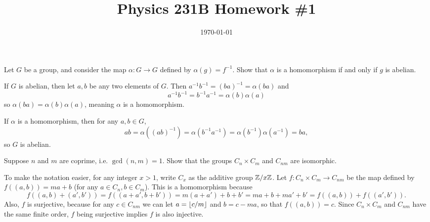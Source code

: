 \documentclass{article}
\date{\today}
\title{Physics 231B Homework \#1}
\begin{document}
\maketitle

\begin{prob}
    Let $G$ be a group, and consider the map $\alpha: G \rightarrow G$ defined by $\alpha(g)=f^{-1}$. Show that $\alpha$ is a homomorphism if and only if $g$ is abelian.
\end{prob}
\par
If $G$ is abelian, then let $a,b$ be any two elements of $G$. Then $a^{-1}b^{-1} = \left( ba \right)^{-1} = \alpha \left( ba \right)$ and
\[ a^{-1}b^{-1}=b^{-1}a^{-1}=\alpha(b) \alpha(a) \]
so $\alpha(ba)=\alpha(b)\alpha(a)$, meaning $\alpha$ is a homomorphism.
\par
If $\alpha$ is a homomorphism, then for any $a,b \in G$,
\[ ab=\alpha \left( (ab)^{-1} \right) = \alpha(b^{-1}a^{-1}) = \alpha(b^{-1}) \alpha(a^{-1}) = ba, \]
so $G$ is abelian.

\bigskip
\begin{prob}
    Suppose $n$ and $m$ are coprime, i.e. $\gcd(n,m)=1$. Show that the groups $C_n \times C_m$ and $C_{nm}$ are isomorphic.
\end{prob}
To make the notation easier, for any integer $x>1$, write $C_x$ as the additive group $\mathbb{Z}/x\mathbb{Z}$. Let $f: C_n \times C_m \rightarrow C_{nm}$ be the map defined by $f((a,b)) = ma+b$ (for any $a \in C_n, b \in C_m$). This is a homomorphism because
\[ f\left( (a,b) + (a', b') \right) = f\left( (a+a',b+b') \right) =m(a+a')+b+b'=ma+b + ma'+b' = f\left( (a,b) \right) + f\left( (a',b') \right). \]
Also, $f$ is surjective, because for any $c \in C_{nm}$ we can let $a=\left\lfloor c/m \right\rfloor$ and $b=c-ma$, so that $f((a,b))=c$. Since $C_n \times C_m$ and $C_{nm}$ have the same finite order, $f$ being surjective implies $f$ is also injective.
\end{document}
